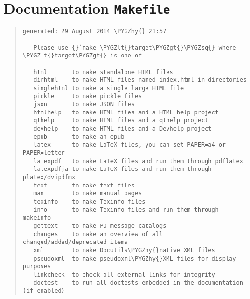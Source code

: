\documentclass[letterpaper,10pt,english]{sphinxmanual}
\def\PYGZlt{\char`\<}
\def\PYGZgt{\char`\>}
\def\PYGZhy{\char`\-}
\def\PYGZsq{\char`\'}
\begin{document}
\section{Documentation \texttt{Makefile}}
\label{docs_makefile::doc}\label{docs_makefile:documentation-makefile}\begin{quote}

\begin{Verbatim}[commandchars=\\\{\}]
generated: 29 August 2014 \PYGZhy{} 21:57

   Please use {}`make \PYGZlt{}target\PYGZgt{}\PYGZsq{} where \PYGZlt{}target\PYGZgt{} is one of

   html       to make standalone HTML files
   dirhtml    to make HTML files named index.html in directories
   singlehtml to make a single large HTML file
   pickle     to make pickle files
   json       to make JSON files
   htmlhelp   to make HTML files and a HTML help project
   qthelp     to make HTML files and a qthelp project
   devhelp    to make HTML files and a Devhelp project
   epub       to make an epub
   latex      to make LaTeX files, you can set PAPER=a4 or PAPER=letter
   latexpdf   to make LaTeX files and run them through pdflatex
   latexpdfja to make LaTeX files and run them through platex/dvipdfmx
   text       to make text files
   man        to make manual pages
   texinfo    to make Texinfo files
   info       to make Texinfo files and run them through makeinfo
   gettext    to make PO message catalogs
   changes    to make an overview of all changed/added/deprecated items
   xml        to make Docutils\PYGZhy{}native XML files
   pseudoxml  to make pseudoxml\PYGZhy{}XML files for display purposes
   linkcheck  to check all external links for integrity
   doctest    to run all doctests embedded in the documentation (if enabled)
\end{Verbatim}
\end{quote}
\end{document}
